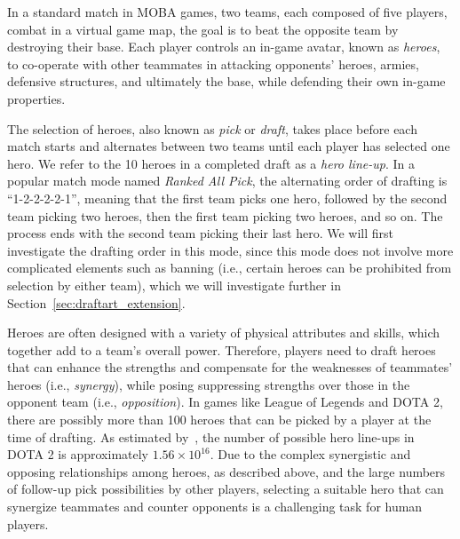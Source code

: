 In a standard match in MOBA games, two teams, each composed of five players, combat in a virtual game map, the goal is to beat the opposite team by destroying their base. Each player controls an in-game avatar, known as \textit{heroes}, to co-operate with other teammates in attacking opponents' heroes, armies, defensive structures, and ultimately the base, while defending their own in-game properties. 

The selection of heroes, also known as \textit{pick} or \textit{draft}, takes place before each match starts and alternates between two teams until each player has selected one hero. We refer to the 10 heroes in a completed draft as a \textit{hero line-up}. In a popular match mode
named \textit{Ranked All Pick}, the alternating order of drafting is ``1-2-2-2-2-1'', meaning that the first team picks one hero, followed by the second team picking two heroes, then the first team picking two heroes, and so on. The process ends with the second team picking their last hero. We will first investigate the drafting order in this mode, since this mode does not involve more complicated elements such as banning (i.e., certain heroes can be prohibited from selection by either team), which we will investigate further in Section~\ref{sec:draftart_extension}. 

Heroes are often designed with a variety of physical attributes and skills, which together add to a team's overall power. Therefore, players need to draft heroes that can enhance the strengths and compensate for the weaknesses of teammates' heroes (i.e., \textit{synergy}), while posing suppressing strengths over those in the opponent team (i.e., \textit{opposition}). In games like League of Legends and DOTA 2, there are possibly more than 100 heroes that can be picked by a player at the time of drafting. As estimated by~\textcite{hanke2017reco}, the number of possible hero line-ups in DOTA 2 is approximately $1.56 \times 10^{16}$. Due to the complex synergistic and opposing relationships among heroes, as described above, and the large numbers of follow-up pick possibilities by other players, selecting a suitable hero that can synergize teammates and counter opponents is a challenging task for human players. 


